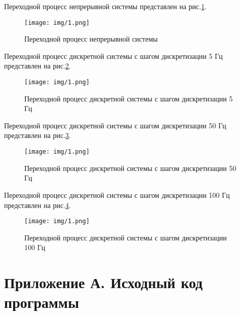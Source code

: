 \documentclass[14pt,a4paper]{extreport}
\begin{document}
Переходной процесс непрерывной системы 
представлен на рис.\ref{fig:contin}.
\begin{figure}[h]
    \centering
    \texttt{[image: img/1.png]}
    \caption{Переходной процесс непрерывной системы}
    \label{fig:contin}
\end{figure}

Переходной процесс дискретной системы с шагом дискретизации 
5 Гц представлен на рис.\ref{fig:discrete5}.

\begin{figure}[h]
    \centering
    \texttt{[image: img/1.png]}
    \caption{Переходной процесс дискретной системы 
    с шагом дискретизации 5 Гц}
    \label{fig:discrete5}
\end{figure}

Переходной процесс дискретной системы с шагом дискретизации 
50 Гц представлен на рис.\ref{fig:discrete50}.

\begin{figure}[h]
    \centering
    \texttt{[image: img/1.png]}
    \caption{Переходной процесс дискретной системы 
    с шагом дискретизации 50 Гц}
    \label{fig:discrete50}
\end{figure}

Переходной процесс дискретной системы с шагом дискретизации 
100 Гц представлен на рис.\ref{fig:discrete100}.

\begin{figure}[h]
    \centering
    \texttt{[image: img/1.png]}
    \caption{Переходной процесс дискретной системы 
    с шагом дискретизации 100 Гц}
    \label{fig:discrete100}
\end{figure}


\newpage
\chapter*{Приложение А. Исходный код программы}
\end{document}
